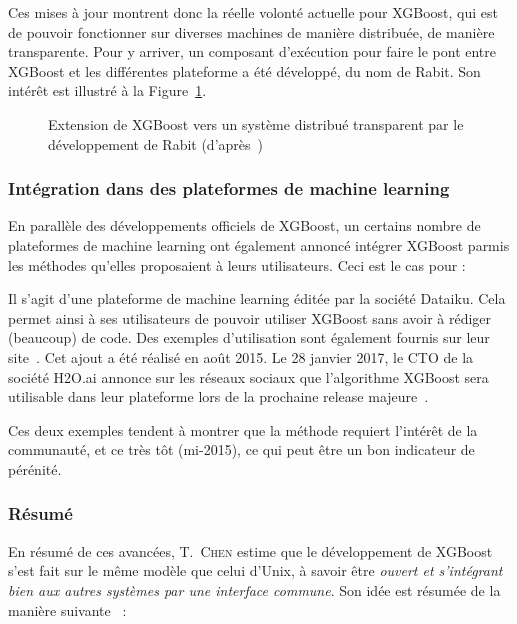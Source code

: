 Ces mises à jour montrent donc la réelle volonté actuelle pour XGBoost, qui est de pouvoir fonctionner sur diverses machines de manière distribuée, de manière transparente. Pour y arriver, un composant d'exécution pour faire le pont entre XGBoost et les différentes plateforme a été développé, du nom de Rabit. Son intérêt est illustré à la Figure~\ref{fig:dev_trois}.

\begin{figure}[h]
	\begin{margincap}
		\centering
	  	\resizebox{.98\textwidth}{!}{%
		}
		\caption{Extension de XGBoost vers un système distribué transparent par le développement de Rabit (d'après~\cite{bib:xgboost-author})}
		\label{fig:dev_trois}
	\end{margincap}
\end{figure}

\subsubsection{Intégration dans des plateformes de machine learning}
En parallèle des développements \og officiels\fg{} de XGBoost, un certains nombre de plateformes de machine learning ont également annoncé intégrer XGBoost parmis les méthodes qu'elles proposaient à leurs utilisateurs. Ceci est le cas pour :
\begin{itemize}
	Il s'agit d'une plateforme de machine learning éditée par la société Dataiku. Cela permet ainsi à ses utilisateurs de pouvoir utiliser XGBoost sans avoir à rédiger (beaucoup) de code. Des exemples d'utilisation sont également fournis sur leur site~\cite{bib:xgboost-dataiku}. Cet ajout a été réalisé en août 2015.
	Le 28 janvier 2017, le CTO de la société H2O.ai annonce sur les réseaux sociaux que l'algorithme XGBoost sera utilisable dans leur plateforme lors de la prochaine release majeure~\cite{bib:xgboost-hdeuxo}.
\end{itemize}
Ces deux exemples tendent à montrer que la méthode requiert l'intérêt de la communauté, et ce très tôt (mi-2015), ce qui peut être un bon indicateur de pérénité.

\subsubsection{Résumé}
En résumé de ces avancées, T.~\textsc{Chen} estime que le développement de XGBoost s'est fait sur le même modèle que celui d'Unix, à savoir être \og \textit{ouvert et s'intégrant bien aux autres systèmes par une interface commune}. Son idée est résumée de la manière suivante~\cite{bib:xgboost-author} :


